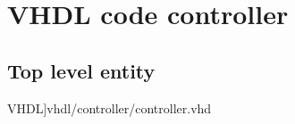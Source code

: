 \section{VHDL code controller}
\subsection{Top level entity}
\scriptsize 
  VHDL]{vhdl/controller/controller.vhd}
 \normalsize
\label{code:sram_ent}